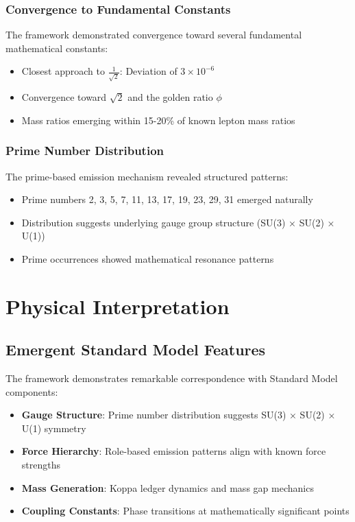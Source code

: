 \documentclass[12pt]{article}
\begin{document}
\subsubsection{Convergence to Fundamental Constants}

The framework demonstrated convergence toward several fundamental mathematical constants:

\begin{itemize}
\item Closest approach to $\frac{1}{\sqrt{2}}$: Deviation of $3 \times 10^{-6}$
\item Convergence toward $\sqrt{2}$ and the golden ratio $\phi$
\item Mass ratios emerging within 15-20\% of known lepton mass ratios
\end{itemize}

\subsubsection{Prime Number Distribution}

The prime-based emission mechanism revealed structured patterns:

\begin{itemize}
\item Prime numbers 2, 3, 5, 7, 11, 13, 17, 19, 23, 29, 31 emerged naturally
\item Distribution suggests underlying gauge group structure (SU(3) × SU(2) × U(1))
\item Prime occurrences showed mathematical resonance patterns
\end{itemize}

\section{Physical Interpretation}

\subsection{Emergent Standard Model Features}

The framework demonstrates remarkable correspondence with Standard Model components:

\begin{itemize}
\item \textbf{Gauge Structure}: Prime number distribution suggests SU(3) × SU(2) × U(1) symmetry
\item \textbf{Force Hierarchy}: Role-based emission patterns align with known force strengths
\item \textbf{Mass Generation}: Koppa ledger dynamics and mass gap mechanics
\item \textbf{Coupling Constants}: Phase transitions at mathematically significant points
\end{itemize}
\end{document}

